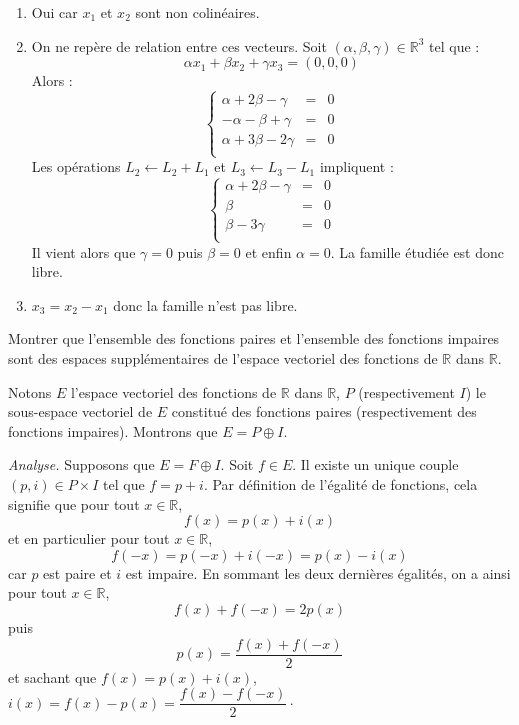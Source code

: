 \documentclass[a4paper,twoside,french,11pt]{VcCours}
\begin{document}
\begin{enumerate}
\item Oui car $x_1$ et $x_2$ sont non colinéaires.
\item On ne repère de relation entre ces vecteurs. Soit $(\alpha, \beta, \gamma) \in \mathbb{R}^3$ tel que :
$$ \alpha x_1 + \beta x_2 + \gamma x_3 = (0,0,0)$$
Alors :
$$ \left\lbrace \begin{array}{ccl}
\alpha + 2 \beta - \gamma & = & 0 \\
- \alpha - \beta + \gamma & = & 0 \\
\alpha+ 3 \beta -2 \gamma & = & 0 \\
\end{array}\right.$$
Les opérations $L_2 \leftarrow L_2+L_1$ et $L_3 \leftarrow L_3- L_1$ impliquent :
$$ \left\lbrace \begin{array}{rcl}
\alpha + 2 \beta - \gamma & = & 0 \\
  \beta & = & 0 \\
  \beta -3 \gamma & = & 0 \\
\end{array}\right.$$
Il vient alors que $\gamma=0$ puis $\beta=0$ et enfin $\alpha=0$. La famille étudiée est donc libre.
\item $x_3=x_2-x_1$ donc la famille n'est pas libre.
\end{enumerate}

\begin{Exercice}{} Montrer que l'ensemble des fonctions paires et l'ensemble des fonctions impaires sont des espaces supplémentaires de l'espace vectoriel des fonctions de $\mathbb{R}$ dans $\mathbb{R}$. 
\end{Exercice}

\corr Notons $E$ l'espace vectoriel des fonctions de $\mathbb{R}$ dans $\mathbb{R}$, $P$ (respectivement $I$) le sous-espace vectoriel de $E$ constitué des fonctions paires (respectivement des fonctions impaires). Montrons que $E= P \oplus I$.

\medskip

\textit{Analyse.} Supposons que $E= F \oplus I$. Soit $f \in E$. Il existe un unique couple $(p,i) \in P \times I$ tel que $f=p + i$. Par définition de l'égalité de fonctions, cela signifie que pour tout $x \in \mathbb{R}$,
$$ f(x) = p(x)+i(x)$$
et en particulier pour tout $x \in \mathbb{R}$,
$$ f(-x) = p(-x)+i(-x) = p(x)-i(x)$$
car $p$ est paire et $i$ est impaire. En sommant les deux dernières égalités, on a ainsi pour tout $x \in \mathbb{R}$,
$$ f(x)+f(-x) = 2p(x) $$
puis
$$ p(x) = \frac{f(x)+f(-x)}{2}$$
et sachant que $f(x)=p(x)+i(x)$, $i(x)=f(x)-p(x) = \dfrac{f(x)-f(-x)}{2}\cdot$
\end{document}
